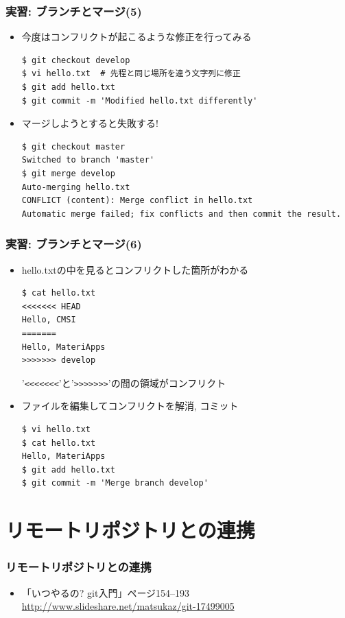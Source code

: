 \begin{frame}[t,fragile]
  \frametitle{実習: ブランチとマージ(5)}
  \begin{itemize}
  \item 今度はコンフリクトが起こるような修正を行ってみる
\begin{lstlisting}
$ git checkout develop
$ vi hello.txt  # 先程と同じ場所を違う文字列に修正
$ git add hello.txt
$ git commit -m 'Modified hello.txt differently'
\end{lstlisting}
  \item マージしようとすると失敗する!
\begin{lstlisting}
$ git checkout master
Switched to branch 'master'
$ git merge develop
Auto-merging hello.txt
CONFLICT (content): Merge conflict in hello.txt
Automatic merge failed; fix conflicts and then commit the result.
\end{lstlisting}
  \end{itemize}
\end{frame}

\begin{frame}[t,fragile]
  \frametitle{実習: ブランチとマージ(6)}
  \begin{itemize}
  \item hello.txtの中を見るとコンフリクトした箇所がわかる
\begin{lstlisting}
$ cat hello.txt
<<<<<<< HEAD
Hello, CMSI
=======
Hello, MateriApps
>>>>>>> develop
\end{lstlisting}
'\verb+<<<<<<<+'と'\verb+>>>>>>>+'の間の領域がコンフリクト \\[.5em]
  \item ファイルを編集してコンフリクトを解消, コミット
\begin{lstlisting}
$ vi hello.txt
$ cat hello.txt
Hello, MateriApps
$ git add hello.txt
$ git commit -m 'Merge branch develop'
\end{lstlisting}
  \end{itemize}
\end{frame}

\section{リモートリポジトリとの連携}

\begin{frame}
  \frametitle{リモートリポジトリとの連携}
  \begin{itemize}
  \item 「いつやるの? git入門」ページ154--193 \\
    \url{http://www.slideshare.net/matsukaz/git-17499005}
  \end{itemize}
\end{frame}

